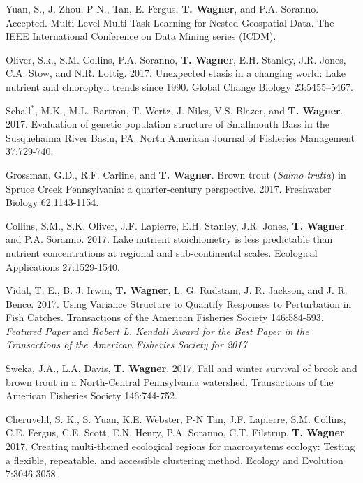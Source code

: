 \documentclass[10pt]{article}
\begin{document}
\begin{flushleft}
\begin{etaremune}[start=68]
\item Yuan, S., J. Zhou, P-N., Tan, E. Fergus, {\bf T. Wagner}, and P.A. Soranno. Accepted. Multi-Level Multi-Task Learning for Nested Geospatial Data. The IEEE International Conference on Data Mining series (ICDM).

\item Oliver, S.k., S.M. Collins, P.A. Soranno, {\bf T. Wagner}, E.H. Stanley, J.R. Jones, C.A. Stow, and N.R. Lottig. 2017. Unexpected stasis in a changing world: Lake nutrient and chlorophyll trends since 1990. Global Change Biology 23:5455–5467.

\item Schall$^*$, M.K., M.L. Bartron, T. Wertz, J. Niles, V.S. Blazer, and {\bf T. Wagner}. 2017. Evaluation of genetic population structure of Smallmouth Bass in the Susquehanna River Basin, PA. North American Journal of Fisheries Management 37:729-740.

\item Grossman, G.D., R.F. Carline, and {\bf T. Wagner}. Brown trout (\emph{Salmo trutta}) in Spruce Creek Pennsylvania: a quarter-century perspective. 2017. Freshwater Biology 62:1143-1154.

\item Collins, S.M., S.K. Oliver, J.F. Lapierre, E.H. Stanley, J.R. Jones, {\bf T. Wagner}. and P.A. Soranno. 2017. Lake nutrient stoichiometry is less predictable than nutrient concentrations at regional and sub-continental scales. Ecological Applications 27:1529-1540.

\item Vidal, T. E., B. J. Irwin, {\bf T. Wagner}, L. G. Rudstam, J. R. Jackson, and J. R. Bence. 2017. Using Variance Structure to Quantify Responses to Perturbation in Fish Catches. Transactions of the American Fisheries Society 146:584-593. \emph{Featured Paper} and \emph{Robert L. Kendall Award for the Best Paper in the Transactions of the American Fisheries Society for 2017}

\item Sweka, J.A., L.A. Davis, {\bf T. Wagner}. 2017. Fall and winter survival of brook and brown trout in a North-Central Pennsylvania watershed. Transactions of the American Fisheries Society 146:744-752.

\item Cheruvelil, S. K., S. Yuan, K.E. Webster, P-N Tan, J.F. Lapierre, S.M. Collins, C.E. Fergus, C.E. Scott, E.N. Henry, P.A. Soranno, C.T. Filstrup, {\bf T. Wagner}. 2017. Creating multi-themed ecological regions for macrosystems ecology: Testing a flexible, repeatable, and accessible clustering method. Ecology and Evolution 7:3046-3058.


\end{etaremune}
\end{flushleft}
\end{document}
